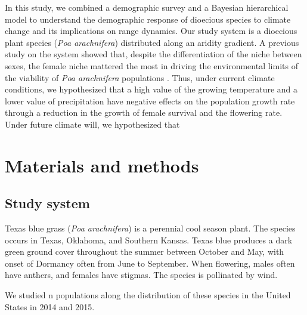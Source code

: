\documentclass[11pt]{article}
\begin{document}
In this study, we combined a demographic survey and a Bayesian hierarchical model to understand the demographic response of dioecious species to climate change and its implications on range dynamics.
Our study system is a dioecious plant species (\textit{Poa arachnifera}) distributed along an aridity gradient. 
A previous study on the system showed that, despite the differentiation of the niche between sexes, the female niche mattered the most in driving the environmental limits of the viability of \textit {Poa arachnifera} populations \citep{miller2022two}. 
Thus, under current climate conditions, we hypothesized that a high value of the growing temperature and a lower value of precipitation have negative effects on the population growth rate through a reduction in the growth of female survival and the flowering rate.
Under future climate will, we hypothesized that  

\section*{Materials and methods}

\subsection*{Study system}
Texas blue grass (\textit{Poa arachnifera}) is a perennial cool season plant. 
The species occurs in Texas, Oklahoma, and Southern Kansas. 
Texas blue produces a dark green ground cover throughout the summer between October and May, with onset of Dormancy often from June to September.
When flowering, males often have anthers, and females have stigmas. The species is pollinated by wind. 

We studied n populations along the distribution of these species in the United States in 2014 and 2015. 



\end{document}
